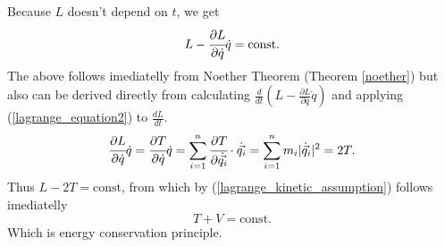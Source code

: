 \documentclass[main.tex]{subfiles}
\begin{document}
Because $L$ doesn't depend on $t$, we get
\begin{equation}
L - \cfrac{\partial L}{\partial \dot{q}} \dot{q} = \text{const}.
\end{equation}
The above follows imediatelly from Noether Theorem (Theorem \ref{noether}) but also can be derived directly from calculating $\frac{d}{dt}(L - \frac{\partial L}{\partial \dot{q}} \dot{q})$ and applying (\ref{lagrange_equation2}) to $\frac{dL}{dt}$.
\begin{equation}
\cfrac{\partial L}{\partial \dot{q}} \dot{q} = \cfrac{\partial T}{\partial \dot{q}} \dot{q} = \sum_{i=1}^n \cfrac{\partial T}{\partial \dot{\vec{q_i}}} \cdot \dot{\vec{q_i}} = \sum_{i=1}^n m_i|\dot{\vec{q}}_i|^2 = 2T.
\end{equation}
Thus $L - 2T = \text{const}$, from which by (\ref{lagrange_kinetic_assumption}) follows imediatelly
\begin{equation}
T + V = \text{const}.
\end{equation}
Which is energy conservation principle.
\end{document}
